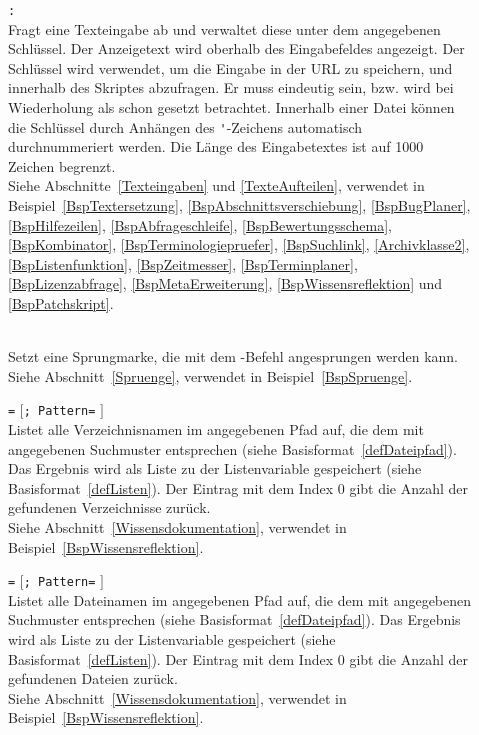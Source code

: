 \begin{description}
\item[]  \verb|:| \\
Fragt eine Texteingabe ab und verwaltet diese unter dem angegebenen Schlüssel. Der Anzeigetext wird oberhalb des Eingabefeldes angezeigt.
Der Schlüssel wird verwendet, um die Eingabe in der URL zu speichern, und innerhalb des Skriptes abzufragen. Er muss eindeutig sein, bzw. wird bei Wiederholung als schon gesetzt betrachtet. Innerhalb einer Datei können die Schlüssel durch Anhängen des \verb|'|-Zeichens automatisch durchnummeriert werden. Die Länge des Eingabetextes ist auf 1000 Zeichen begrenzt.\\
Siehe Abschnitte~\ref{Texteingaben} und \ref{TexteAufteilen}, verwendet in Beispiel~\ref{BspTextersetzung}, \ref{BspAbschnittsverschiebung}, \ref{BspBugPlaner}, \ref{BspHilfezeilen}, \ref{BspAbfrageschleife}, \ref{BspBewertungsschema}, \ref{BspKombinator}, \ref{BspTerminologiepruefer}, \ref{BspSuchlink}, \ref{Archivklasse2}, \ref{BspListenfunktion}, \ref{BspZeitmesser}, \ref{BspTerminplaner}, \ref{BspLizenzabfrage}, \ref{BspMetaErweiterung}, \ref{BspWissensreflektion} und \ref{BspPatchskript}.

\item[] \\
Setzt eine Sprungmarke, die mit dem -Befehl angesprungen werden kann.\\
Siehe Abschnitt~\ref{Spruenge}, verwendet in Beispiel~\ref{BspSpruenge}.

\item[]  \verb|=|  $[$\verb|; Pattern=| $]$\\
Listet alle Verzeichnisnamen im angegebenen Pfad auf, die dem mit  angegebenen Suchmuster entsprechen (siehe Basisformat~\ref{defDateipfad}). Das Ergebnis wird als Liste zu der Listenvariable gespeichert (siehe Basisformat~\ref{defListen}). Der Eintrag mit dem Index $0$ gibt die Anzahl der gefundenen Verzeichnisse zurück.\\
Siehe Abschnitt~\ref{Wissensdokumentation}, verwendet in Beispiel~\ref{BspWissensreflektion}.

\item[]  \verb|=|  $[$\verb|; Pattern=| $]$\\
Listet alle Dateinamen im angegebenen Pfad auf, die dem mit  angegebenen Suchmuster entsprechen (siehe Basisformat~\ref{defDateipfad}). Das Ergebnis wird als Liste zu der Listenvariable gespeichert (siehe Basisformat~\ref{defListen}). Der Eintrag mit dem Index $0$ gibt die Anzahl der gefundenen Dateien zurück.\\
Siehe Abschnitt~\ref{Wissensdokumentation}, verwendet in Beispiel~\ref{BspWissensreflektion}.


\end{description}
